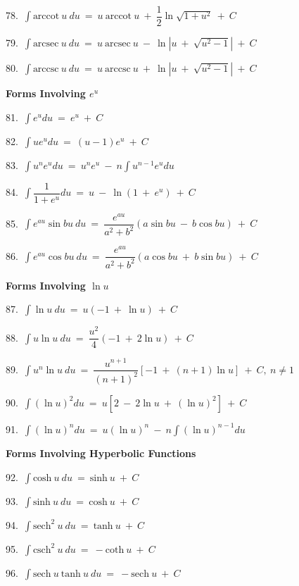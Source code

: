 \documentclass{article}
\begin{document}
\begin{large}
\begin{small}
78.\ $\displaystyle\int \text{arccot}\ u\ du\ =\ u\ \text{arccot}\ u\ +\ \dfrac{1}{2} \ln\sqrt{1+u^{2}}\ +\ C$

79.\ $\displaystyle\int \text{arcsec}\ u\ du\ =\ u\ \text{arcsec}\ u\ -\ \ln|u\ +\ \sqrt{u^{2}-1}|\ +\ C$

80.\ $\displaystyle\int \text{arccsc}\ u\ du\ =\ u\ \text{arccsc}\ u\ +\ \ln|u\ +\ \sqrt{u^{2}-1}|\ +\ C$

\textbf{Forms Involving $e^{u}$}

81.\ $\displaystyle\int e^{u}du\ =\ e^{u}\ +\ C$

82.\ $\displaystyle\int ue^{u}du\ =\ (u-1)e^{u}\ +\ C$

83.\ $\displaystyle\int u^{n}e^{u}du\ =\ u^{n}e^{u}\ -\ n\displaystyle\int u^{n-1}e^{u}du$

84.\ $\displaystyle\int \dfrac{1}{1+e^{u}}du\ =\ u\ -\ \ln(1\ +\ e^{u})\ +\ C$

85.\ $\displaystyle\int e^{au}\sin bu\ du\ =\ \dfrac{e^{au}}{a^{2}+b^{2}}(a\sin bu\ -\ b\cos bu)\ +\ C$

86.\ $\displaystyle\int e^{au}\cos bu\ du\ =\ \dfrac{e^{au}}{a^{2}+b^{2}}(a\cos bu\ +\ b\sin bu)\ +\ C$

\textbf{Forms Involving $\ln u$}

87.\ $\displaystyle\int \ln u\ du\ =\ u(-1\ +\ \ln u)\ +\ C$

88.\ $\displaystyle\int u\ln u\ du\ =\ \dfrac{u^{2}}{4}(-1\ +\ 2\ln u)\ +\ C$

89.\ $\displaystyle\int u^{n}\ln u\ du\ =\ \dfrac{u^{n+1}}{(n+1)^{2}}[-1\ +\ (n+1)\ln u]\ +\ C,\ n\neq 1$

90.\ $\displaystyle\int (\ln u)^{2}du\ =\ u[2\ -\ 2\ln u\ +\ (\ln u)^{2}]\ +\ C$

91.\ $\displaystyle\int (\ln u)^{n}du\ =\ u(\ln u)^{n}\ -\ n\displaystyle\int (\ln u)^{n-1}du$

\textbf{Forms Involving Hyperbolic Functions}

92.\ $\displaystyle\int \text{cosh}\ u\ du\ =\ \text{sinh}\ u\ +\ C$

93.\ $\displaystyle\int \text{sinh}\ u\ du\ =\ \text{cosh}\ u\ +\ C$

94.\ $\displaystyle\int \text{sech}^{2}\ u\ du\ =\ \text{tanh}\ u\ +\ C$

95.\ $\displaystyle\int \text{csch}^{2}\ u\ du\ =\ -\text{coth}\ u\ +\ C$

96.\ $\displaystyle\int \text{sech}\ u\ \text{tanh}\ u\ du\ =\ -\text{sech}\ u\ +\ C$


\end{small}
\end{large}
\end{document}
